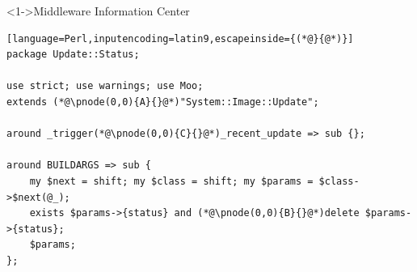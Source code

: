 \documentclass[ngerman,xcolor={table,dvipsnames},smaller,compress,hyperref={bookmarks,colorlinks},handout]{beamer}%
\begin{document}
\begin{frame}[t,fragile]

\begin{block}<1->{Middleware Information Center}
\scriptsize
\begin{lstlisting}[language=Perl,inputencoding=latin9,escapeinside={(*@}{@*)}]
package Update::Status;

use strict; use warnings; use Moo;
extends (*@\pnode(0,0){A}{}@*)"System::Image::Update";

around _trigger(*@\pnode(0,0){C}{}@*)_recent_update => sub {};

around BUILDARGS => sub {
    my $next = shift; my $class = shift; my $params = $class->$next(@_);
    exists $params->{status} and (*@\pnode(0,0){B}{}@*)delete $params->{status};
    $params;
};
\end{lstlisting}
\end{block}

\begin{itemize}
\end{itemize}


\end{frame}
\end{document}
